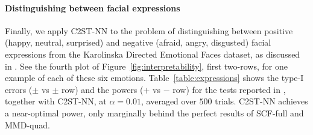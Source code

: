 \documentclass[a4paper]{article}
\begin{document}
  \paragraph{Distinguishing between facial expressions} Finally, we apply
  C2ST-NN to the problem of distinguishing between positive (happy,
  neutral, surprised) and negative (afraid, angry, disgusted) facial
  expressions from the Karolinska Directed Emotional Faces dataset, as
  discussed in \citep{metests}. See the fourth plot of
  Figure~\ref{fig:interpretability}, first two-rows, for one example of each of
  these six emotions. Table~\ref{table:expressions} shows the type-I errors
  ($\pm$ vs $\pm$ row) and the powers ($+$ vs $-$ row) 
  for the tests reported in \citep{metests}, together with C2ST-NN, at $\alpha = 0.01$, 
  averaged over $500$ trials. C2ST-NN achieves a near-optimal
  power, only marginally behind the perfect results of SCF-full and
  MMD-quad.

  \begin{table}
  \vspace{-0.2cm}
  \caption{Type-I errors (first row) and powers (rest of rows) in distinguishing
  NIPS papers categories.}
  \vspace{-0.2cm}
  \label{table:nips}
  \end{table}
\end{document}
